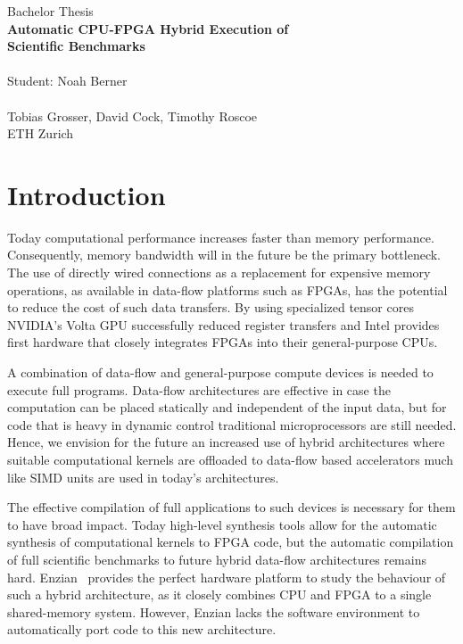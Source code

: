 \documentclass[10pt]{article}
\begin{document}
\begingroup  
  \centering
{\Large Bachelor Thesis}\\
  \LARGE \textbf{
Automatic CPU-FPGA Hybrid Execution of\\
Scientific Benchmarks
}\\~\\
  \Large Student: Noah Berner~\\~\\
 
  \large Tobias Grosser, David Cock, Timothy Roscoe\\
ETH Zurich\\
{
\centering
}
\endgroup

\section*{Introduction}
Today computational performance increases faster than memory performance.
Consequently, memory bandwidth will in the future be the primary bottleneck.
The use of directly wired connections as a replacement for expensive memory
operations, as available in data-flow platforms such as FPGAs, has the
potential to reduce the cost of such data transfers. By using specialized
tensor cores NVIDIA's Volta GPU successfully reduced register transfers
and Intel provides first hardware that closely integrates FPGAs into their
general-purpose CPUs.

A combination of data-flow and general-purpose compute devices is needed to
execute full programs. Data-flow architectures are effective in case the
computation can be placed statically and independent of the input data, but
for code that is heavy in dynamic control traditional microprocessors are still
needed. Hence, we envision for the future an increased use of hybrid
architectures where suitable computational kernels are offloaded to data-flow
based accelerators much like SIMD units are used in today's architectures.

The effective compilation of full applications to such devices is necessary
for them to have broad impact. Today high-level synthesis tools allow for
the automatic synthesis of computational kernels to FPGA code, but the
automatic compilation of full scientific benchmarks to future hybrid
data-flow architectures remains hard. Enzian~\cite{Enzian} provides the
perfect hardware platform to study the behaviour of such a hybrid architecture, as
it closely combines CPU and FPGA to a single shared-memory system. However,
Enzian lacks the software environment to automatically port code to this new
architecture.
\end{document}
